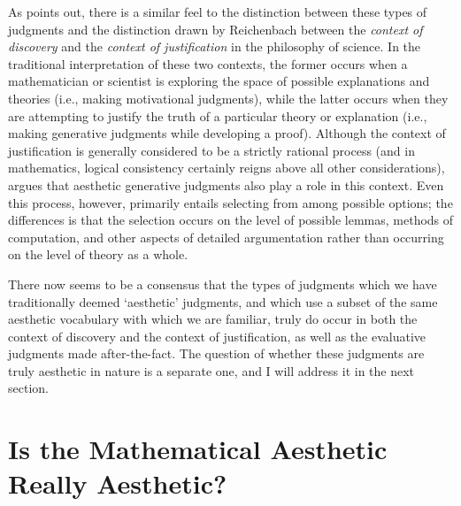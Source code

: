 \documentclass[a4paper,man,natbib]{apa6}
\begin{document}
As \cite{ivanova_aesthetic_2017} points out, there is a similar feel to the distinction between these types of judgments 
and the distinction drawn by Reichenbach \citep{sep-reichenbach} between the \textit{context of discovery} and the
\textit{context of justification} in the philosophy of science. In the traditional interpretation of these two contexts,
the former occurs when a mathematician or scientist is exploring the space of possible explanations and theories (i.e., 
making motivational judgments), while the latter occurs when they are attempting to justify the truth of a particular 
theory or explanation (i.e., making generative judgments while developing a proof). Although the context of justification 
is generally considered to be a strictly rational process (and in mathematics, logical consistency certainly reigns above all other
considerations), \cite{cellucci_mathematical_2015} argues that aesthetic generative judgments also play a role 
in this context. Even this process, however, primarily entails selecting from among possible options; the differences is
that the selection occurs on the level of possible lemmas, methods of computation, and other aspects of detailed 
argumentation rather than occurring on the level of theory as a whole.

There now seems to be a consensus that the types of judgments which we have traditionally deemed `aesthetic' judgments,
and which use a subset of the same aesthetic vocabulary with which we are familiar, truly do occur in both the context
of discovery and the context of justification, as well as the evaluative judgments made after-the-fact. The question of 
whether these judgments are truly aesthetic in nature is a separate one, and I will address it in the next section. 



\section{Is the Mathematical Aesthetic Really Aesthetic?}
\end{document}
